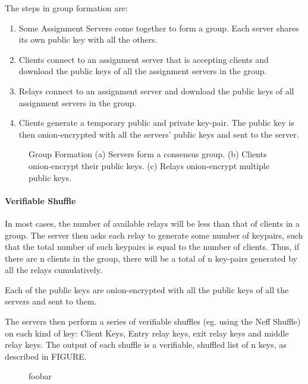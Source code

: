 The steps in group formation are: 
\begin{enumerate} 
\item Some Assignment Servers come together to form a group. Each server shares 
its own public key with all the others. 
\item Clients connect to an assignment server that is accepting clients and 
download the public keys of all the assignment servers in the group.
\item Relays connect to an assignment server and download the public
keys of all assignment servers in the group. 
\item Clients generate a temporary public and private key-pair. The public key 
is then onion-encrypted with all the servers' public keys and sent to the server.
\end{enumerate}

\begin{figure}[htbp]
  \centering
  \caption{Group Formation (a) Servers form a consensus group. 
    (b) Clients onion-encrypt their public keys. 
    (c) Relays onion-encrypt multiple public keys.}
  \label{rfidtag_testing}
\end{figure}

\paragraph{Verifiable Shuffle} 
In most cases, the number of available relays will be less than that of clients 
in a group. The server then asks each relay to generate some number of 
keypairs, such that the total number of such keypairs is equal to the number of 
clients. Thus, if there are n clients in the group, there will be a total of n
key-pairs generated by all the relays cumulatively. 

Each of the public keys are onion-encrypted with all the public keys of all the 
servers and sent to them.

The servers then perform a series of verifiable shuffles (eg. using the Neff
Shuffle\cite{neff2001verifiable}) on each kind of key: Client Keys, Entry relay 
keys, exit relay keys and middle relay keys. The output of each shuffle is a 
verifiable, shuffled list of n keys, as described in FIGURE. 

\begin{figure}[htb]
\centering
\hspace{\fill}%
\hspace{\fill}%
\hspace*{\fill}%
\caption[bla]{foobar}
\end{figure}

